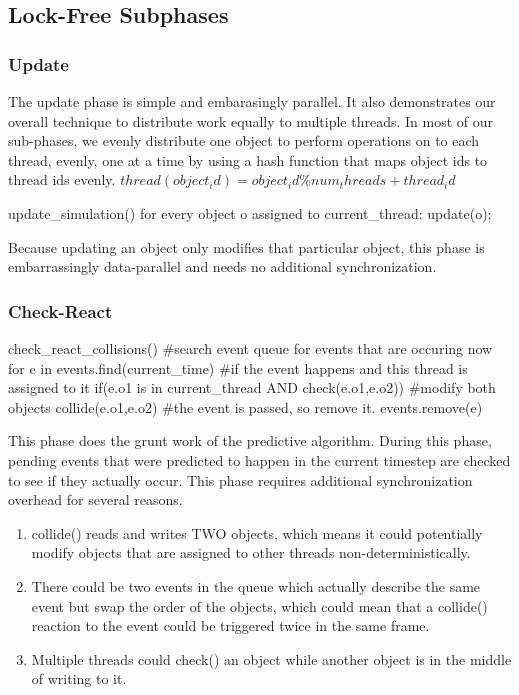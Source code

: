 \documentclass[conference]{IEEEtran}
\begin{document}
\subsection{Lock-Free Subphases}
\label{sec:subphase}
\subsubsection{Update}

The update phase is simple and embarasingly parallel.  It also demonstrates our overall technique to distribute work equally to multiple threads.  In most of our sub-phases,
we evenly distribute one object to perform operations on to each thread, evenly, one at a time by using a hash function that maps object ids to thread ids evenly. 
$thread(object_id)=object_id \% num_threads+thread_id$
\begin{verbatimtab}[3]
update_simulation()
{
   for every object o assigned to current_thread:
      update(o);
}
\end{verbatimtab}

Because updating an object only modifies that particular object, this phase is embarrassingly data-parallel and needs no additional synchronization.

\subsubsection{Check-React}

\begin{verbatimtab}[3]
check_react_collisions()
{
   #search event queue for events that are occuring now
   for e in events.find(current_time)
   {
	#if the event happens and this thread is assigned to it
	if(e.o1 is in current_thread AND check(e.o1,e.o2))
	{
		#modify both objects
		collide(e.o1,e.o2)
	}
	#the event is passed, so remove it.
	events.remove(e)
   }
}
\end{verbatimtab}
This phase does the grunt work of the predictive algorithm.  During this phase, pending events that were predicted to happen in the current timestep are checked to see if they actually occur.  This phase requires additional synchronization overhead for several reasons.

\begin{enumerate}
	\item collide() reads and writes TWO objects, which means it could potentially modify objects that are assigned to other threads non-deterministically.
	\item There could be two events in the queue which actually describe the same event but swap the order of the objects, which could mean that a collide() reaction to the event could be triggered twice in the same frame.
	\item Multiple threads could check() an object while another object is in the middle of writing to it.
\end{enumerate}
\end{document}
